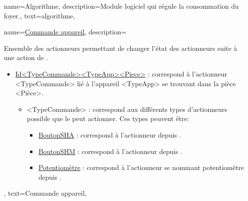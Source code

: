 {
    name={Algorithme},
    description={Module logiciel qui régule la consommation du foyer.},
    text={algorithme},
}

{
    name={\underline{Commande appareil}},
    description={Ensemble des actionneurs permettant de changer l'état des actionneurs suite à une action de \complete.
    \begin{itemize}
        \item \underline{Id<TypeCommande><TypeApp><Piece>} : correspond à l'actionneur <TypeCommande> lié à l'appareil <TypeApp> se trouvant dans la pièce <Pièce>.
        \begin{itemize}
            \item {<TypeCommande>} : correspond aux différents types d'actionneurs possible que le \complete peut actionner. Ces types peuvent être:    
            \begin{itemize}
                \item \underline{BoutonSHA} : correspond à l'actionneur depuis \complete.
                \item \underline{BoutonSHM} : correspond à l'actionneur depuis \complete.
                \item \underline{Potentiomètre} :  correspond à l'actionneur se nommant potentiomètre depuis \complete.
            \end{itemize}
        \end{itemize}
    \end{itemize}
    },
    text={Commande appareil},
}

